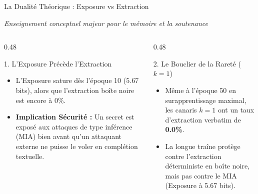 \documentclass[aspectratio=169, 10pt, table]{beamer}
\newcommand{\subtitleline}[1]{{\small\itshape\color{TSPcyan}#1\par}\vspace{0.15cm}}
\begin{document}
\begin{frame}{La Dualité Théorique : Exposure vs Extraction}
    \subtitleline{Enseignement conceptuel majeur pour le mémoire et la soutenance}
    \begin{columns}[T]
        \begin{column}{0.48\textwidth}
            \begin{block}{1. L'Exposure Précède l'Extraction}
                \begin{itemize}
                    \item L'Exposure sature dès l'époque 10 ($5.67$ bits), alors que l'extraction boîte noire est encore à $0\%$.
                    \item \textbf{Implication Sécurité :} Un secret est exposé aux attaques de type inférence (MIA) bien avant qu'un attaquant externe ne puisse le voler en complétion textuelle.
                \end{itemize}
            \end{block}
        \end{column}
        \begin{column}{0.48\textwidth}
            \begin{block}{2. Le Bouclier de la Rareté ($k=1$)}
                \begin{itemize}
                    \item Même à l'époque 50 en surapprentissage maximal, les canaris $k=1$ ont un taux d'extraction verbatim de \textbf{0.0\%}.
                    \item La longue traîne protège contre l'extraction déterministe en boîte noire, mais pas contre le MIA (Exposure à 5.67 bits).
                \end{itemize}
            \end{block}
        \end{column}
    \end{columns}
\end{frame}
\end{document}
